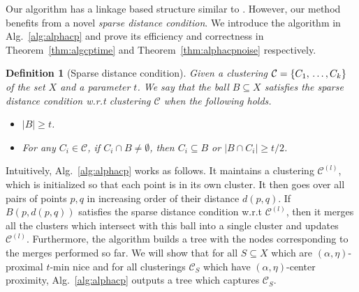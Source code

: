 \documentclass[12pt]{article}
\newtheorem{definition}[theorem]{Definition}
\newcommand{\mc}{\mathcal}
\begin{document}
Our algorithm has a linkage based structure similar to \cite{balcan2012clustering}. However, our method benefits from a novel {\it sparse distance condition}. We introduce the algorithm in Alg.~\ref{alg:alphacp} and prove its efficiency and correctness in Theorem~\ref{thm:algcptime} and Theorem~\ref{thm:alphacpnoise} respectively. 

\begin{definition}[Sparse distance condition]
	 Given a clustering $\mc C = \{C_1,\\\ldots,C_k\}$ of the set $X$ and a parameter $t$. We say that the ball $B \subseteq X$ satisfies the sparse distance condition w.r.t clustering $\mc C$ when the following holds.
\begin{itemize}[noitemsep,nolistsep,leftmargin=*]
\item $|B| \ge t$.
\item For any $C_i \in \mc C$, if $C_i \cap B \neq \emptyset$, then $C_i \subseteq B$ or $|B \cap C_i| \ge t/2$.
\end{itemize}
\end{definition}

Intuitively, Alg.~\ref{alg:alphacp} works as follows. It maintains a clustering $\mc C^{(l)}$, which is initialized so that each point is in its own cluster. It then goes over all pairs of points $p, q$ in increasing order of their distance $d(p, q)$. If $B(p, d(p,q))$ satisfies the sparse distance condition w.r.t $\mc C^{(l)}$, then it merges all the clusters which intersect with this ball into a single cluster and updates $\mc C^{(l)}$. Furthermore, the algorithm builds a tree with the nodes corresponding to the merges performed so far. We will show that for all $S \subseteq X$ which are $(\alpha, \eta)$-proximal $t$-min nice and for all clusterings $\mc C_S$ which have $(\alpha, \eta)$-center proximity, Alg.~\ref{alg:alphacp} outputs a tree which captures $\mc C_S$.

\SetAlgoNoLine
\LinesNumbered
\SetNlSkip{-0.4em}
\end{document}
